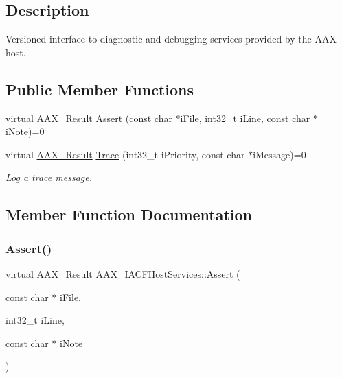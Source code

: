 \subsection{Description}
Versioned interface to diagnostic and debugging services provided by the A\+AX host. \subsection*{Public Member Functions}
\begin{DoxyCompactItemize}
\item 
virtual \mbox{\hyperlink{a00392_a4d8f69a697df7f70c3a8e9b8ee130d2f}{A\+A\+X\+\_\+\+Result}} \mbox{\hyperlink{a01713_a49111de18abd12b671ae16138e244af3}{Assert}} (const char $\ast$i\+File, int32\+\_\+t i\+Line, const char $\ast$i\+Note)=0
\item 
virtual \mbox{\hyperlink{a00392_a4d8f69a697df7f70c3a8e9b8ee130d2f}{A\+A\+X\+\_\+\+Result}} \mbox{\hyperlink{a01713_ac6a48553ca0643d2505ce23862921a80}{Trace}} (int32\+\_\+t i\+Priority, const char $\ast$i\+Message)=0
\begin{DoxyCompactList}\small\item\em Log a trace message. \end{DoxyCompactList}\end{DoxyCompactItemize}


\subsection{Member Function Documentation}
\mbox{\label{a01713_a49111de18abd12b671ae16138e244af3}} 
\subsubsection{\texorpdfstring{Assert()}{Assert()}}
{\footnotesize\ttfamily virtual \mbox{\hyperlink{a00392_a4d8f69a697df7f70c3a8e9b8ee130d2f}{A\+A\+X\+\_\+\+Result}} A\+A\+X\+\_\+\+I\+A\+C\+F\+Host\+Services\+::\+Assert (\begin{DoxyParamCaption}\item[{const char $\ast$}]{i\+File,  }\item[{int32\+\_\+t}]{i\+Line,  }\item[{const char $\ast$}]{i\+Note }\end{DoxyParamCaption})\hspace{0.3cm}{\ttfamily [pure virtual]}}

